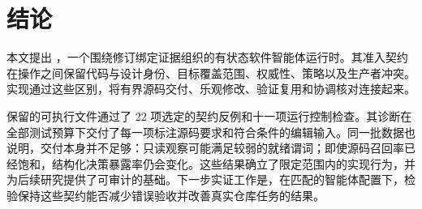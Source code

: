 \section{结论}
\label{sec:conclusion}
本文提出 \wcode{}，一个围绕修订绑定证据组织的有状态软件智能体运行时。其准入契约在操作之间保留代码与设计身份、目标覆盖范围、权威性、策略以及生产者冲突。实现通过这些区别，将有界源码交付、乐观修改、验证复用和协调核对连接起来。

保留的可执行文件通过了 22 项选定的契约反例和十一项运行控制检查。其诊断在全部测试预算下交付了每一项标注源码要求和符合条件的编辑输入。同一批数据也说明，交付本身并不足够：只读观察可能满足较弱的就绪谓词；即使源码召回率已经饱和，结构化决策暴露率仍会变化。这些结果确立了限定范围内的实现行为，并为后续研究提供了可审计的基础。下一步实证工作是，在匹配的智能体配置下，检验保持这些契约能否减少错误验收并改善真实仓库任务的结果。

